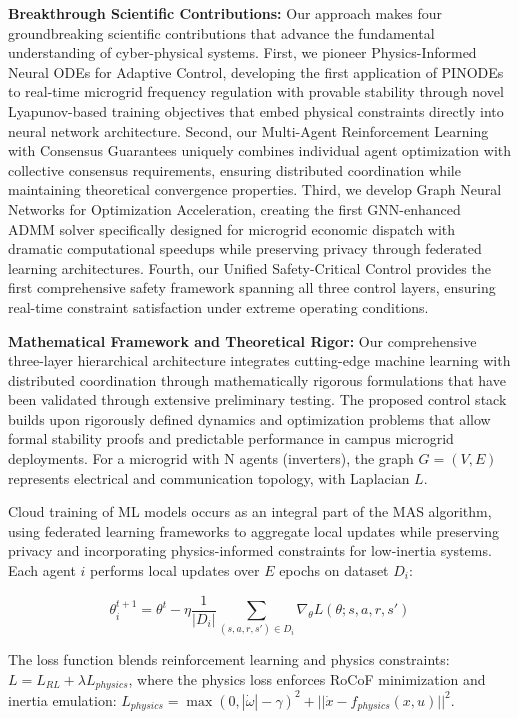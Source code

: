 \documentclass[12pt]{article}
\begin{document}
\textbf{Breakthrough Scientific Contributions:} Our approach makes four groundbreaking scientific contributions that advance the fundamental understanding of cyber-physical systems. First, we pioneer Physics-Informed Neural ODEs for Adaptive Control, developing the first application of PINODEs to real-time microgrid frequency regulation with provable stability through novel Lyapunov-based training objectives that embed physical constraints directly into neural network architecture. Second, our Multi-Agent Reinforcement Learning with Consensus Guarantees uniquely combines individual agent optimization with collective consensus requirements, ensuring distributed coordination while maintaining theoretical convergence properties. Third, we develop Graph Neural Networks for Optimization Acceleration, creating the first GNN-enhanced ADMM solver specifically designed for microgrid economic dispatch with dramatic computational speedups while preserving privacy through federated learning architectures. Fourth, our Unified Safety-Critical Control provides the first comprehensive safety framework spanning all three control layers, ensuring real-time constraint satisfaction under extreme operating conditions.

\textbf{Mathematical Framework and Theoretical Rigor:} Our comprehensive three-layer hierarchical architecture integrates cutting-edge machine learning with distributed coordination through mathematically rigorous formulations that have been validated through extensive preliminary testing. The proposed control stack builds upon rigorously defined dynamics and optimization problems that allow formal stability proofs and predictable performance in campus microgrid deployments. For a microgrid with N agents (inverters), the graph $G = (V, E)$ represents electrical and communication topology, with Laplacian $L$.

Cloud training of ML models occurs as an integral part of the MAS algorithm, using federated learning frameworks to aggregate local updates while preserving privacy and incorporating physics-informed constraints for low-inertia systems. Each agent $i$ performs local updates over $E$ epochs on dataset $D_i$:

$$\theta_i^{t+1} = \theta^t - \eta \frac{1}{|D_i|} \sum_{(s,a,r,s') \in D_i} \nabla_{\theta} L(\theta; s, a, r, s')$$

The loss function blends reinforcement learning and physics constraints: $L = L_{RL} + \lambda L_{physics}$, where the physics loss enforces RoCoF minimization and inertia emulation: $L_{physics} = \max(0, |\dot{\omega}| - \gamma)^2 + ||\dot{x} - f_{physics}(x, u)||^2$.
\end{document}
